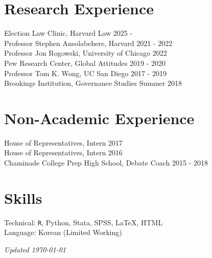 \documentclass[margin, line]{res}
\begin{document}
\begin{resume}
\section{Research Experience}
Election Law Clinic, Harvard Law \hfill 2025 - \\
Professor Stephen Ansolabehere, Harvard \hfill 2021 - 2022\\
Professor Jon Rogowski, University of Chicago \hfill 2022\\
Pew Research Center, Global Attitudes \hfill 2019 - 2020\\
Professor Tom K. Wong, UC San Diego \hfill 2017 - 2019\\
Brookings Institution, Governance Studies \hfill Summer 2018

\section{Non-Academic Experience}
House of Representatives, Intern \hfill 2017\\
House of Representatives, Intern \hfill 2016\\
Chaminade College Prep High School, Debate Coach \hfill 2015 - 2018

\section{Skills}
Technical: \texttt{R}, Python, Stata, SPSS, \LaTeX, HTML\\
Language: Korean (Limited Working)

\vspace*{\fill}

\hfill \small{\textit{Updated \today}}

\end{resume}
\end{document}
